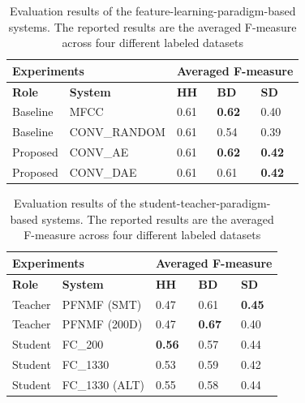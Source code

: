 \documentclass{article}
\begin{document}
\begin{table}[]
\centering
\label{my-label}
\begin{tabular}{lllll}
\hline
\multicolumn{2}{l}{\textbf{Experiments}}             & \multicolumn{3}{l}{\textbf{Averaged F-measure}} \\ \hline
\textbf{Role} & \multicolumn{1}{l|}{\textbf{System}} & \textbf{HH}   & \textbf{BD}    & \textbf{SD}    \\ \hline
Baseline      & \multicolumn{1}{l|}{MFCC}            & 0.61          & \textbf{0.62}  & 0.40           \\
Baseline      & \multicolumn{1}{l|}{CONV\_RANDOM}    & 0.61          & 0.54           & 0.39           \\
Proposed      & \multicolumn{1}{l|}{CONV\_AE}        & 0.61          & \textbf{0.62}  & \textbf{0.42}  \\
Proposed      & \multicolumn{1}{l|}{CONV\_DAE}       & 0.61          & 0.61           & \textbf{0.42}  \\ \hline
\end{tabular}
\caption{Evaluation results of the feature-learning-paradigm-based systems. The reported results are the averaged F-measure across four different labeled datasets}
\end{table}
\begin{table}[]
\centering
\label{my-label}
\begin{tabular}{lllll}
\hline
\multicolumn{2}{l}{\textbf{Experiments}}                    & \multicolumn{3}{l}{\textbf{Averaged F-measure}} \\ \hline
\textbf{Role} & \multicolumn{1}{l|}{\textbf{System}}        & \textbf{HH}    & \textbf{BD}    & \textbf{SD}   \\ \hline
Teacher       & \multicolumn{1}{l|}{PFNMF (SMT)}            & 0.47           & 0.61           & \textbf{0.45} \\
Teacher       & \multicolumn{1}{l|}{PFNMF (200D)}           & 0.47           & \textbf{0.67}  & 0.40          \\
Student       & \multicolumn{1}{l|}{FC\_200}                & \textbf{0.56}  & 0.57           & 0.44          \\
Student       & \multicolumn{1}{l|}{FC\_1330}               & 0.53           & 0.59           & 0.42          \\
Student       & \multicolumn{1}{l|}{FC\_1330 (ALT)} & 0.55           & 0.58           & 0.44          \\ \hline
\end{tabular}
\caption{Evaluation results of the student-teacher-paradigm-based systems. The reported results are the averaged F-measure across four different labeled datasets}
\end{table}
\end{document}
